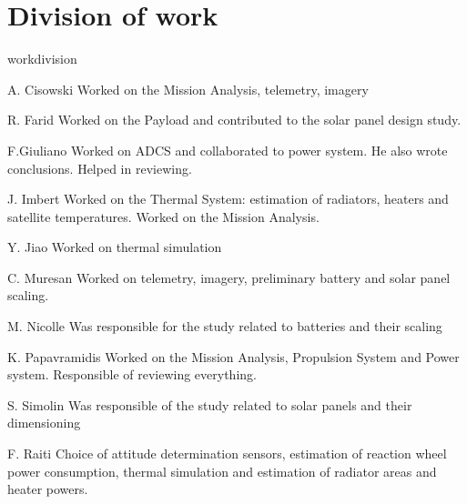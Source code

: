\documentclass[a4paper, oneside, 11pt]{article}
\begin{document}
\section{Division of work}

\begin{labeling}{workdivision}


\item [A. Cisowski] Worked on the Mission Analysis, telemetry, imagery

\item [R. Farid] Worked on the Payload and contributed to the solar panel design study.

\item [F.Giuliano] Worked on ADCS and collaborated to power system. He also wrote conclusions. Helped in reviewing. 

\item [J. Imbert] Worked on the Thermal System: estimation of radiators, heaters and satellite temperatures. Worked on the Mission Analysis.

\item [Y. Jiao] Worked on thermal simulation

\item [ C. Muresan] Worked on telemetry, imagery, preliminary battery and solar panel scaling.

\item [M. Nicolle] Was responsible for the study related to batteries and their scaling

\item [K. Papavramidis ] Worked on the Mission Analysis, Propulsion System and Power system. Responsible of reviewing everything. 

\item [S. Simolin] Was responsible of the study related to solar panels and their dimensioning

\item [F. Raiti] Choice of attitude determination sensors, estimation of reaction wheel power consumption, thermal simulation and estimation of radiator areas and heater powers.

\end{labeling}

\clearpage
\end{document}
